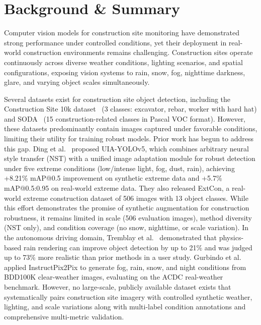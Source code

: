 \documentclass[12pt]{article}
\begin{document}
\section{Background \& Summary}

Computer vision models for construction site monitoring have demonstrated strong performance under controlled conditions, yet their deployment in real-world construction environments remains challenging. Construction sites operate continuously across diverse weather conditions, lighting scenarios, and spatial configurations, exposing vision systems to rain, snow, fog, nighttime darkness, glare, and varying object scales simultaneously.

Several datasets exist for construction site object detection, including the Construction Site 10k dataset~\citep{chen2025vlm} (3 classes: excavator, rebar, worker with hard hat) and SODA~\citep{duan2022soda} (15 construction-related classes in Pascal VOC format). However, these datasets predominantly contain images captured under favorable conditions, limiting their utility for training robust models. Prior work has begun to address this gap. Ding et al.~\citep{ding2024uiayolo} proposed UIA-YOLOv5, which combines arbitrary neural style transfer (NST) with a unified image adaptation module for robust detection under five extreme conditions (low/intense light, fog, dust, rain), achieving +8.21\% mAP@0.5 improvement on synthetic extreme data and +5.7\% mAP@0.5:0.95 on real-world extreme data. They also released ExtCon, a real-world extreme construction dataset of 506 images with 13 object classes. While this effort demonstrates the promise of synthetic augmentation for construction robustness, it remains limited in scale (506 evaluation images), method diversity (NST only), and condition coverage (no snow, nighttime, or scale variation). In the autonomous driving domain, Tremblay et al.~\citep{tremblay2021rain} demonstrated that physics-based rain rendering can improve object detection by up to 21\% and was judged up to 73\% more realistic than prior methods in a user study. Gurbindo et al.~\citep{gurbindo2025ip2p} applied InstructPix2Pix to generate fog, rain, snow, and night conditions from BDD100K clear-weather images, evaluating on the ACDC real-weather benchmark. However, no large-scale, publicly available dataset exists that systematically pairs construction site imagery with controlled synthetic weather, lighting, and scale variations along with multi-label condition annotations and comprehensive multi-metric validation.
\end{document}
